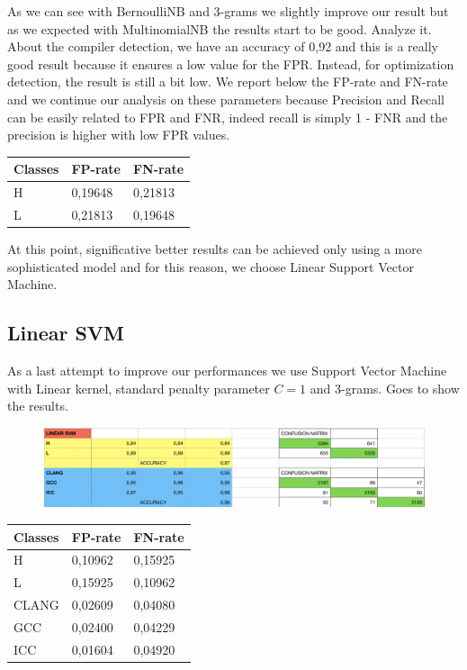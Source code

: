 \documentclass[12pt]{article}
\begin{document}
As we can see with BernoulliNB and 3-grams we slightly improve our result but as we expected with MultinomialNB the results start to be good. Analyze it.
About the compiler detection, we have an accuracy of 0,92 and this is a really good result because it ensures a low value for the FPR. Instead, for optimization detection, the result is still a bit low. We report below the FP-rate and FN-rate and we continue our analysis on these parameters because Precision and Recall can be easily related to FPR and FNR, indeed recall is simply 1 - FNR and the precision is higher with low FPR values.

\bigskip
\begin{tabular}{ | l | l | l | }
 \hline
 \textbf{Classes} & \textbf{FP-rate} & \textbf{FN-rate} \\ \hline
 H & 0,19648 & 0,21813 \\ \hline
 L & 0,21813 & 0,19648 \\ \hline
\end{tabular}
\bigskip

At this point, significative better results can be achieved only using a more sophisticated model and for this reason, we choose Linear Support Vector Machine.

\subsection{Linear SVM}
As a last attempt to improve our performances we use Support Vector Machine with Linear kernel, standard penalty parameter $C = 1$ and 3-grams. Goes to show the results.

\begin{figure}[!ht]
 \includegraphics[width=1\textwidth]{pic6}
 \label{fig: Linear SVM with 3-grams}
\end{figure}

\bigskip
\begin{tabular}{ | l | l | l | }
 \hline
 \textbf{Classes} & \textbf{FP-rate} & \textbf{FN-rate} \\ \hline
 H & 0,10962 & 0,15925 \\ \hline
 L & 0,15925 & 0,10962 \\ \hline
 CLANG & 0,02609 & 0,04080 \\ \hline
 GCC & 0,02400 & 0,04229 \\ \hline
 ICC & 0,01604 & 0,04920 \\ \hline
\end{tabular}
\bigskip
\end{document}
